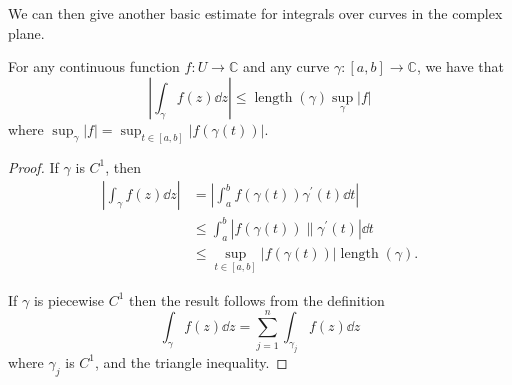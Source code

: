 \documentclass[a4paper]{scrartcl}
\begin{document}
We can then give another basic estimate for integrals over curves in the complex plane.

\begin{proposition}
    For any continuous function $f: U \rightarrow \mathbb{C}$ and any curve $\gamma:[a, b] \rightarrow \mathbb{C}$, we have that
    $$
    \left|\int_{\gamma} f(z) \dd z\right| \leq \operatorname{length}(\gamma) \sup _{\gamma}|f|
    $$
    where $\sup _{\gamma}|f|=\sup _{t \in[a, b]}|f(\gamma(t))|$.
\end{proposition}
\begin{proof}
If $\gamma$ is $C^{1}$, then 
\begin{align*}
\left|\int_{\gamma} f(z) \dd z\right|&=\left|\int_{a}^{b} f(\gamma(t)) \gamma^{\prime}(t) \dd t\right| \\
&\leq\int_{a}^{b}\left|f(\gamma(t)) \| \gamma^{\prime}(t)\right| \dd t \\
&\leq \sup _{t \in[a, b]}|f(\gamma(t))| \operatorname{length}(\gamma).
\end{align*} 

If $\gamma$ is piecewise $C^{1}$ then the result follows from the definition 
$$\int_{\gamma} f(z) \dd z=\sum_{j=1}^{n} \int_{\gamma_{j}} f(z) \dd z$$ 
where $\gamma_{j}$ is $C^{1}$, and the triangle inequality.
\end{proof}
\end{document}
